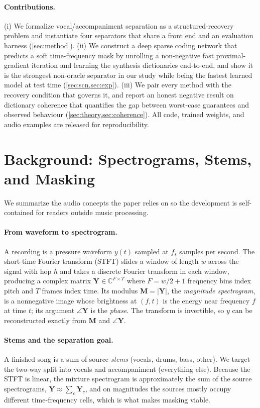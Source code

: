 \documentclass{article}
\newcommand{\M}{\bm{M}}
\newcommand{\Y}{\bm{Y}}
\begin{document}
\paragraph{Contributions.} (i) We formalize vocal/accompaniment separation as a
structured-recovery problem and instantiate four separators that share a front end
and an evaluation harness (\cref{sec:method}). (ii) We construct a deep sparse
coding network that predicts a soft time-frequency mask by unrolling a
non-negative fast proximal-gradient iteration and learning the synthesis
dictionaries end-to-end, and show it is the strongest non-oracle separator in our
study while being the fastest learned model at test time
(\cref{sec:scn,sec:exp}). (iii) We pair every method with the recovery condition
that governs it, and report an honest negative result on dictionary coherence that
quantifies the gap between worst-case guarantees and observed behaviour
(\cref{sec:theory,sec:coherence}). All code, trained weights, and audio examples
are released for reproducibility.

\section{Background: Spectrograms, Stems, and Masking}
\label{sec:background}
We summarize the audio concepts the paper relies on so the development is
self-contained for readers outside music processing.

\paragraph{From waveform to spectrogram.}
A recording is a pressure waveform $y(t)$ sampled at $f_s$ samples per second. The
short-time Fourier transform (STFT) slides a window of length $w$ across the
signal with hop $h$ and takes a discrete Fourier transform in each window,
producing a complex matrix $\Y\in\mathbb C^{F\times T}$ where $F=w/2+1$ frequency
bins index pitch and $T$ frames index time. Its modulus $\M=\lvert\Y\rvert$, the
\emph{magnitude spectrogram}, is a nonnegative image whose brightness at
$(f,t)$ is the energy near frequency $f$ at time $t$; its argument $\angle\Y$ is
the \emph{phase}. The transform is invertible, so $y$ can be reconstructed
exactly from $\M$ and $\angle\Y$.

\paragraph{Stems and the separation goal.}
A finished song is a sum of source \emph{stems} (vocals, drums, bass, other). We
target the two-way split into vocals and accompaniment (everything else). Because
the STFT is linear, the mixture spectrogram is approximately the sum of the source
spectrograms, $\Y\approx\sum_c\Y_c$, and on magnitudes the sources mostly occupy
different time-frequency cells, which is what makes masking viable.
\end{document}
